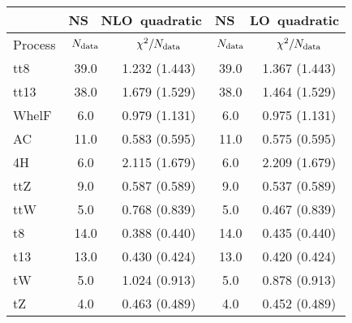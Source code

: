 \documentclass{article}
\begin{document}
\begin{table}[H]
\centering
\begin{tabular}{|l|c|c|c|c|}
\hline
& \multicolumn{2}{c|}{\rm NS \ NLO\ quadratic}& \multicolumn{2}{c|}{\rm NS\ \ LO\ quadratic}\\ \hline
Process  & $N_{\rm data}$ & $\chi^2/N_{\rm data}$ & $N_{\rm data}$ & $\chi^2/N_{\rm data}$\\ \hline
tt8 & 39.0                         & 1.232                             (1.443) & 39.0                         & 1.367                             (1.443) \\ \hline
tt13 & 38.0                         & 1.679                             (1.529) & 38.0                         & 1.464                             (1.529) \\ \hline
WhelF & 6.0                         & 0.979                             (1.131) & 6.0                         & 0.975                             (1.131) \\ \hline
AC & 11.0                         & 0.583                             (0.595) & 11.0                         & 0.575                             (0.595) \\ \hline
4H & 6.0                         & 2.115                             (1.679) & 6.0                         & 2.209                             (1.679) \\ \hline
ttZ & 9.0                         & 0.587                             (0.589) & 9.0                         & 0.537                             (0.589) \\ \hline
ttW & 5.0                         & 0.768                             (0.839) & 5.0                         & 0.467                             (0.839) \\ \hline
t8 & 14.0                         & 0.388                             (0.440) & 14.0                         & 0.435                             (0.440) \\ \hline
t13 & 13.0                         & 0.430                             (0.424) & 13.0                         & 0.420                             (0.424) \\ \hline
tW & 5.0                         & 1.024                             (0.913) & 5.0                         & 0.878                             (0.913) \\ \hline
tZ & 4.0                         & 0.463                             (0.489) & 4.0                         & 0.452                             (0.489) \\ \hline

\end{tabular}
\end{table}
\end{document}
